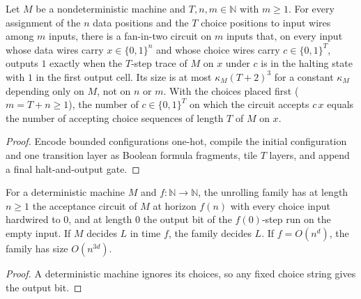 \begin{theorem}
  \label{thm:circuits-acceptance-circuit}
  \leanok
  Let $M$ be a nondeterministic machine and $T, n, m \in \mathbb{N}$ with
  $m \ge 1$. For every assignment of the $n$ data positions and the $T$ choice
  positions to input wires among $m$ inputs, there is a fan-in-two circuit on
  $m$ inputs that, on every input whose data wires carry $x \in \{0,1\}^n$ and
  whose choice wires carry $c \in \{0,1\}^T$, outputs $1$ exactly when the
  $T$-step trace of $M$ on $x$ under $c$ is in the halting state with $1$ in
  the first output cell. Its size is at most $\kappa_M (T + 2)^3$ for a
  constant $\kappa_M$ depending only on $M$, not on $n$ or $m$. With the
  choices placed first ($m = T + n \ge 1$), the number of $c \in \{0,1\}^T$
  on which the circuit accepts $c\,x$ equals the number of accepting choice
  sequences of length $T$ of $M$ on $x$.
\end{theorem}
\begin{proof}
  \leanok
  Encode bounded configurations one-hot, compile the initial configuration and
  one transition layer as Boolean formula fragments, tile $T$ layers, and
  append a final halt-and-output gate.
\end{proof}

\begin{theorem}
  \label{thm:circuits-unrolling-family}
  \leanok
  For a deterministic machine $M$ and $f : \mathbb{N} \to \mathbb{N}$, the
  unrolling family has at length $n \ge 1$ the acceptance circuit of $M$ at
  horizon $f(n)$ with every choice input hardwired to $0$, and at length $0$
  the output bit of the $f(0)$-step run on the empty input. If $M$ decides $L$
  in time $f$, the family decides $L$. If $f = O(n^d)$, the family has size
  $O(n^{3d})$.
\end{theorem}
\begin{proof}
  \leanok
  A deterministic machine ignores its choices, so any fixed choice string
  gives the output bit.
\end{proof}

